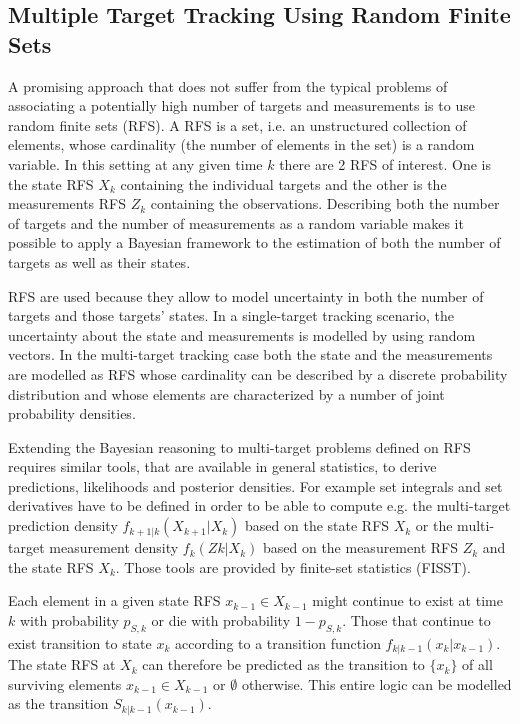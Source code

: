 \subsection{Multiple Target Tracking Using Random Finite Sets}\label{sec:RFS}

A promising approach that does not suffer from the typical problems of associating a potentially high number of targets and measurements is to use random finite sets (RFS). A RFS is a set, i.e. an unstructured collection of elements, whose cardinality (the number of elements in the set) is a random variable. In this setting at any given time $k$ there are 2 RFS of interest. One is the state RFS $X_k$ containing the individual targets and the other is the measurements RFS $Z_k$ containing the observations. Describing both the number of targets and the number of measurements as a random variable makes it possible to apply a Bayesian framework to the estimation of both the number of targets as well as their states.\cite{Vo2006PHD}

RFS are used because they allow to model uncertainty in both the number of targets and those targets' states. In a single-target tracking scenario, the uncertainty about the state and measurements is modelled by using random vectors. In the multi-target tracking case both the state and the measurements are modelled as RFS whose cardinality can be described by a discrete probability distribution and whose elements are characterized by a number of joint probability densities.\cite{Vo2006PHD}

Extending the Bayesian reasoning to multi-target problems defined on RFS requires similar tools, that are available in general statistics, to derive predictions, likelihoods and posterior densities. For example set integrals and set derivatives have to be defined in order to be able to compute e.g. the multi-target prediction density $f_{k+1|k}(X_{k+1}|X_{k})$ based on the state RFS $X_{k}$ or the multi-target measurement density $f_k(Z{k}|X_{k})$ based on the measurement RFS $Z_k$ and the state RFS $X_k$. Those tools are provided by finite-set statistics (FISST).\cite{mahler2003multitarget}

Each element in a given state RFS $x_{k-1} \in X_{k-1}$ might continue to exist at time $k$ with probability $p_{S,k}$ or die with probability $1 - p_{S,k}$. Those that continue to exist transition to state $x_k$ according to a transition function $f_{k|k-1}(x_k|x_{k-1})$. The state RFS at $X_k$ can therefore be predicted as the transition to $\{x_k\}$ of all surviving elements $x_{k-1} \in X_{k-1}$ or $\emptyset$ otherwise. This entire logic can be modelled as the transition $S_{k|k-1}(x_{k-1})$.\cite{Vo2006PHD}


